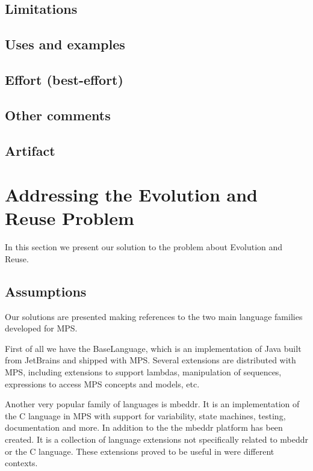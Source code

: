\documentclass[preprint,numbers,10pt]{sigplanconf}
\begin{document}
\subsection{Limitations}

\subsection{Uses and examples}

\subsection{Effort (best-effort)}

\subsection{Other comments}

\subsection{Artifact}

%
%

\section{Addressing the Evolution and Reuse Problem}

In this section we present our solution to the problem about Evolution and Reuse.

\subsection{Assumptions}

Our solutions are presented making references to the two main language families developed for MPS.

First of all we have the BaseLanguage, which is an implementation of Java built from JetBrains and shipped with MPS. Several extensions are distributed with MPS, including extensions to support lambdas, manipulation of sequences, expressions to access MPS concepts and models, etc.

Another very popular family of languages is mbeddr. It is an implementation of the C language in MPS with support for variability, state machines, testing, documentation and more. In addition to the the mbeddr platform has been created. It is a collection of language extensions not specifically related to mbeddr or the C language. These extensions proved to be useful in were different contexts.
\end{document}
